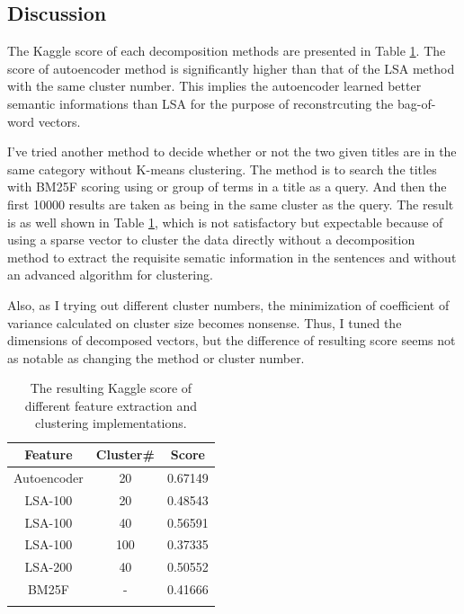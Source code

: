 \documentclass[12pt]{article}
\begin{document}
    \subsection{Discussion}
    \par The Kaggle score of each decomposition methods
    are presented in Table \ref{score}. The score of
    autoencoder method is significantly higher than
    that of the LSA method with the same cluster number.
    This implies the autoencoder learned better
    semantic informations than LSA for the purpose of
    reconstrcuting the bag-of-word vectors.
    \par I've tried another method to decide whether or
    not the two given titles are in the same category
    without K-means clustering. The method is to search
    the titles with BM25F scoring using or group of
    terms in a title as a query. And then the first
    10000 results are taken as being in the same
    cluster as the query. The result is as well shown
    in Table \ref{score}, which is not satisfactory
    but expectable because of using a sparse vector to
    cluster the data directly without a decomposition
    method to extract the requisite sematic information
    in the sentences and without an advanced algorithm
    for clustering.
    \par Also, as I trying out different cluster numbers,
    the minimization of coefficient of variance
    calculated on cluster size becomes nonsense.
    Thus, I tuned the dimensions of decomposed
    vectors, but the difference of resulting score
    seems not as notable as changing the method
    or cluster number.
\begin{table}
  \centering
  \noindent
  \begin{tabular}{ccc}
    Feature & Cluster\# & Score\\
    \hline \space
    Autoencoder & 20 & 0.67149 \\
    LSA-100 & 20 & 0.48543 \\
    LSA-100 & 40 & 0.56591 \\
    LSA-100 & 100 & 0.37335 \\
    LSA-200 & 40 & 0.50552 \\
    BM25F & - & 0.41666 \\
    \hline \space
  \end{tabular}
  \caption{The resulting Kaggle score of different
  feature extraction and clustering implementations.}
  \label{score}
\end{table}
\end{document}
